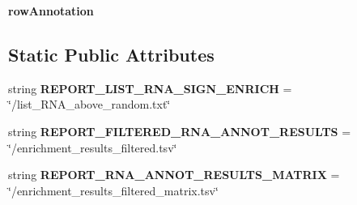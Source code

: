 \begin{DoxyCompactItemize}
\item 
\hypertarget{classsrc_1_1fr_1_1tagc_1_1rainet_1_1core_1_1execution_1_1analysis_1_1EnrichmentAnalysis_1_1Filte941a9d7a59dd1ff35f69bc40c53c882a_afdddc7242ff16155610b4fcc5b1ca237}{{\bfseries row\-Annotation}}\label{classsrc_1_1fr_1_1tagc_1_1rainet_1_1core_1_1execution_1_1analysis_1_1EnrichmentAnalysis_1_1Filte941a9d7a59dd1ff35f69bc40c53c882a_afdddc7242ff16155610b4fcc5b1ca237}

\end{DoxyCompactItemize}
\subsection*{Static Public Attributes}
\begin{DoxyCompactItemize}
\item 
\hypertarget{classsrc_1_1fr_1_1tagc_1_1rainet_1_1core_1_1execution_1_1analysis_1_1EnrichmentAnalysis_1_1Filte941a9d7a59dd1ff35f69bc40c53c882a_a85d427ea9193fa811deaa6b43bf6d92f}{string {\bfseries R\-E\-P\-O\-R\-T\-\_\-\-L\-I\-S\-T\-\_\-\-R\-N\-A\-\_\-\-S\-I\-G\-N\-\_\-\-E\-N\-R\-I\-C\-H} = \char`\"{}/list\-\_\-\-R\-N\-A\-\_\-above\-\_\-random.\-txt\char`\"{}}\label{classsrc_1_1fr_1_1tagc_1_1rainet_1_1core_1_1execution_1_1analysis_1_1EnrichmentAnalysis_1_1Filte941a9d7a59dd1ff35f69bc40c53c882a_a85d427ea9193fa811deaa6b43bf6d92f}

\item 
\hypertarget{classsrc_1_1fr_1_1tagc_1_1rainet_1_1core_1_1execution_1_1analysis_1_1EnrichmentAnalysis_1_1Filte941a9d7a59dd1ff35f69bc40c53c882a_ac00977dfa539cf86444380ca448d7471}{string {\bfseries R\-E\-P\-O\-R\-T\-\_\-\-F\-I\-L\-T\-E\-R\-E\-D\-\_\-\-R\-N\-A\-\_\-\-A\-N\-N\-O\-T\-\_\-\-R\-E\-S\-U\-L\-T\-S} = \char`\"{}/enrichment\-\_\-results\-\_\-filtered.\-tsv\char`\"{}}\label{classsrc_1_1fr_1_1tagc_1_1rainet_1_1core_1_1execution_1_1analysis_1_1EnrichmentAnalysis_1_1Filte941a9d7a59dd1ff35f69bc40c53c882a_ac00977dfa539cf86444380ca448d7471}

\item 
\hypertarget{classsrc_1_1fr_1_1tagc_1_1rainet_1_1core_1_1execution_1_1analysis_1_1EnrichmentAnalysis_1_1Filte941a9d7a59dd1ff35f69bc40c53c882a_aabd346a2e2671e7eafed0d79f52cc0ce}{string {\bfseries R\-E\-P\-O\-R\-T\-\_\-\-R\-N\-A\-\_\-\-A\-N\-N\-O\-T\-\_\-\-R\-E\-S\-U\-L\-T\-S\-\_\-\-M\-A\-T\-R\-I\-X} = \char`\"{}/enrichment\-\_\-results\-\_\-filtered\-\_\-matrix.\-tsv\char`\"{}}\label{classsrc_1_1fr_1_1tagc_1_1rainet_1_1core_1_1execution_1_1analysis_1_1EnrichmentAnalysis_1_1Filte941a9d7a59dd1ff35f69bc40c53c882a_aabd346a2e2671e7eafed0d79f52cc0ce}


\end{DoxyCompactItemize}
